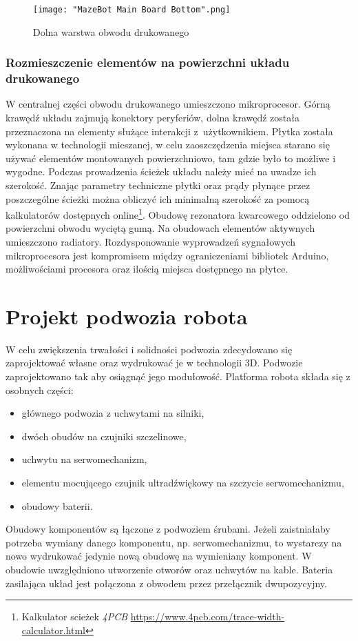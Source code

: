 \documentclass[11pt]{article}
\begin{document}
\begin{figure}[!htbp]
	\centering
	\texttt{[image: "MazeBot Main Board Bottom".png]}
	\caption{Dolna warstwa obwodu drukowanego}
	\label{fig:pcb_bottom}
\end{figure}

\subsubsection{Rozmieszczenie elementów na powierzchni układu drukowanego}
W centralnej części obwodu drukowanego umieszczono mikroprocesor.
Górną krawędź układu zajmują konektory peryferiów, dolna krawędź została przeznaczona na elementy służące interakcji z~użytkownikiem.
Płytka została wykonana w technologii mieszanej, w celu zaoszczędzenia miejsca starano się używać elementów montowanych powierzchniowo, tam gdzie było to możliwe i wygodne.
Podczas prowadzenia ścieżek układu należy mieć na uwadze ich szerokość.
Znając parametry techniczne płytki oraz prądy płynące przez poszczególne ścieżki można obliczyć ich minimalną szerokość za pomocą kalkulatorów dostępnych online\footnote{Kalkulator scieżek \textit{4PCB} \url{https://www.4pcb.com/trace-width-calculator.html}}.
Obudowę rezonatora kwarcowego oddzielono od powierzchni obwodu wyciętą gumą.
Na obudowach elementów aktywnych umieszczono radiatory.
Rozdysponowanie wyprowadzeń sygnałowych mikroprocesora jest kompromisem między ograniczeniami bibliotek Arduino, możliwościami procesora oraz ilością miejsca dostępnego na płytce.

\section{Projekt podwozia robota}
W celu zwiększenia trwałości i solidności podwozia zdecydowano się zaprojektować własne oraz wydrukować je w technologii 3D.
Podwozie zaprojektowano tak aby osiągnąć jego modułowość.
Platforma robota składa się z osobnych części:
\begin{itemize}
	\item głównego podwozia z uchwytami na silniki,
	\item dwóch obudów na czujniki szczelinowe,
	\item uchwytu na serwomechanizm,
	\item elementu mocującego czujnik ultradźwiękowy na szczycie serwomechanizmu,
	\item obudowy baterii.
\end{itemize}
Obudowy komponentów są łączone z podwoziem śrubami. Jeżeli zaistniałaby potrzeba wymiany danego komponentu, np. serwomechanizmu, to wystarczy na nowo wydrukować jedynie nową obudowę na wymieniany komponent.
W obudowie uwzględniono utworzenie otworów oraz uchwytów na kable.
Bateria zasilająca układ jest połączona z obwodem przez przełącznik dwupozycyjny.
\end{document}
